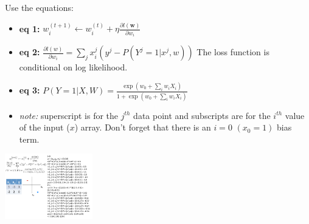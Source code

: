 Use the equations: \hfill \\
\begin{itemize}
	\item \textbf{eq 1:} $w_i^{(t+1)} \leftarrow w_i^{(t)} + \eta \frac{\partial l(\bm{w})}{\partial w_i}$
	\item \textbf{eq 2:} $\displaystyle \frac{\partial l(w)}{\partial w_i} = \sum_j x_i^j (y^j - P(Y^j = 1 | x^j, w))$
			 The loss function is conditional on log likelihood.  %
	\item \textbf{eq 3:} $P(Y=1 | X, W) = \frac{\exp(w_0 + \sum_i w_i X_i)}{1 + \exp(w_0 + \sum_i w_i X_i)}$
	\item \textit{note:} superscript is for the $j^{th}$ data point and 
			subscripts are for the $i^{th}$ value of the input ($x$) array.  
			Don't forget that there is an $i=0$ $(x_0 = 1)$ bias term. 
\end{itemize}
\includegraphics[width=1.5in]{figures/gradient_ascent_logistic_regression.pdf}   \hfill \\
